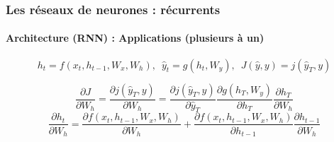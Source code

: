 \documentclass[xcolor=table]{beamer}
\begin{document}
\begin{frame}
	\frametitle{Les réseaux de neurones : récurrents}
	\framesubtitle{Architecture (RNN) : Applications (plusieurs à un)}
	
	\vspace*{-0.5cm}
	\[ h_t = f(x_t, h_{t-1}, W_x, W_h),\,\,\, \hat{y}_t = g(h_t, W_y),\,\,\,  J(\hat{y}, y) = j(\hat{y}_T, y)\]
	
	\begin{minipage}{0.7\textwidth}\scriptsize
		\[\frac{\partial J}{\partial W_h} = \frac{\partial j(\hat{y}_T, y)}{\partial W_h}
		= \frac{\partial j(\hat{y}_T, y)}{\partial \hat{y}_T} 
		\frac{\partial g(h_T, W_y)}{\partial h_T} 
		\frac{\partial h_T}{\partial W_h}
		\]
		\[\frac{\partial h_t}{\partial W_h} = 
		\frac{\partial f(x_t, h_{t-1}, W_x, W_h)}{\partial W_h} + 
		\frac{\partial f(x_t, h_{t-1}, W_x, W_h)}{\partial h_{t-1}} \frac{\partial h_{t-1}}{\partial W_h}
		\]
	\end{minipage}
	\begin{minipage}{0.2\textwidth}
	\end{minipage}

\end{frame}
\end{document}
